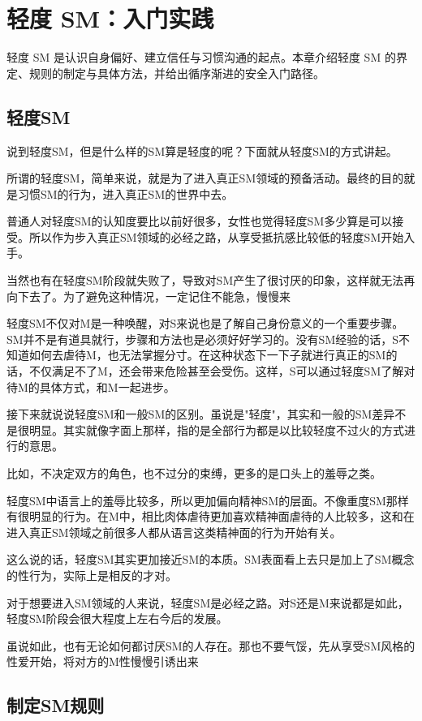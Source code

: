 \documentclass[12pt,UTF8]{ctexbook}
\begin{document}
\chapter{轻度 SM：入门实践}

轻度 SM 是认识自身偏好、建立信任与习惯沟通的起点。本章介绍轻度 SM 的界定、规则的制定与具体方法，并给出循序渐进的安全入门路径。

\section{轻度SM}

说到轻度SM，但是什么样的SM算是轻度的呢？下面就从轻度SM的方式讲起。

所谓的轻度SM，简单来说，就是为了进入真正SM领域的预备活动。最终的目的就是习惯SM的行为，进入真正SM的世界中去。

普通人对轻度SM的认知度要比以前好很多，女性也觉得轻度SM多少算是可以接受。所以作为步入真正SM领域的必经之路，从享受抵抗感比较低的轻度SM开始入手。

当然也有在轻度SM阶段就失败了，导致对SM产生了很讨厌的印象，这样就无法再向下去了。为了避免这种情况，一定记住不能急，慢慢来~

轻度SM不仅对M是一种唤醒，对S来说也是了解自己身份意义的一个重要步骤。SM并不是有道具就行，步骤和方法也是必须好好学习的。没有SM经验的话，S不知道如何去虐待M，也无法掌握分寸。在这种状态下一下子就进行真正的SM的话，不仅满足不了M，还会带来危险甚至会受伤。这样，S可以通过轻度SM了解对待M的具体方式，和M一起进步。

接下来就说说轻度SM和一般SM的区别。虽说是"轻度"，其实和一般的SM差异不是很明显。其实就像字面上那样，指的是全部行为都是以比较轻度不过火的方式进行的意思。

比如，不决定双方的角色，也不过分的束缚，更多的是口头上的羞辱之类。

轻度SM中语言上的羞辱比较多，所以更加偏向精神SM的层面。不像重度SM那样有很明显的行为。在M中，相比肉体虐待更加喜欢精神面虐待的人比较多，这和在进入真正SM领域之前很多人都从语言这类精神面的行为开始有关。

这么说的话，轻度SM其实更加接近SM的本质。SM表面看上去只是加上了SM概念的性行为，实际上是相反的才对。

对于想要进入SM领域的人来说，轻度SM是必经之路。对S还是M来说都是如此，轻度SM阶段会很大程度上左右今后的发展。

虽说如此，也有无论如何都讨厌SM的人存在。那也不要气馁，先从享受SM风格的性爱开始，将对方的M性慢慢引诱出来~

\section{制定SM规则}
\end{document}

